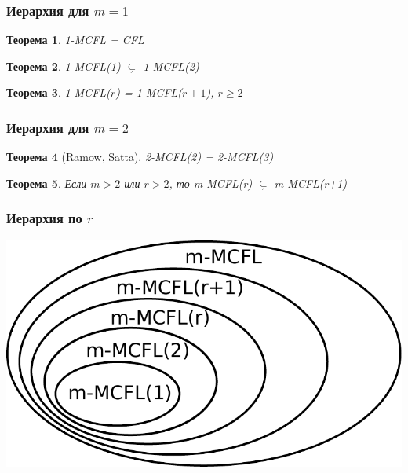 \documentclass{beamer}
\newtheorem{rutheorem}{Теорема}
\begin{document}
\begin{frame}[fragile]
  
 \frametitle{Иерархия для $m=1$}
 \begin{rutheorem}
  1-MCFL = CFL
 \end{rutheorem}
\pause
 \begin{rutheorem}
  1-MCFL(1) $\varsubsetneq$ 1-MCFL(2) 
 \end{rutheorem}
 \pause
 \begin{rutheorem}
  1-MCFL($r$) = 1-MCFL($r+1$), $r\geq2$ 
 \end{rutheorem}

\end{frame}


\begin{frame}[fragile]
  
 \frametitle{Иерархия для $m=2$}
 \begin{rutheorem}[Ramow, Satta]
  2-MCFL(2) = 2-MCFL(3)
 \end{rutheorem}

 \begin{rutheorem}
 Если $m>2$ или $r>2$, то m-MCFL(r) $\varsubsetneq$ m-MCFL(r+1) 
 \end{rutheorem}
 
\end{frame}


\begin{frame}[fragile]
  
  \frametitle{Иерархия по $r$}
  
  \includegraphics[width=\textwidth]{pics/mcfg_2.pdf}

\end{frame}
\end{document}
